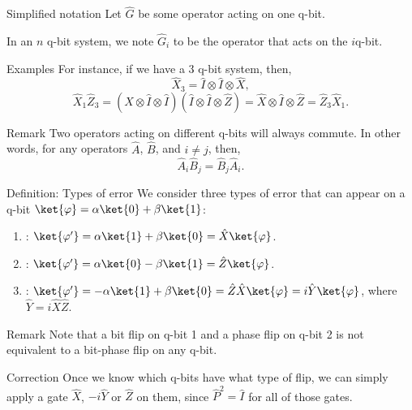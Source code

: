 \documentclass[a4paper]{article}
\begin{document}
\begin{parag}{Simplified notation}
    Let $\hat{G}$ be some operator acting on one q-bit. 

    In an $n$ q-bit system, we note $\hat{G}_i$ to be the operator that acts on the $i$\Th q-bit.

    \begin{subparag}{Examples}
        For instance, if we have a 3 q-bit system, then, 
        \[\hat{X}_3 = \hat{I} \otimes \hat{I} \otimes \hat{X},\]
        \[\hat{X}_1 \hat{Z}_3 = \left(\hat{X} \otimes \hat{I} \otimes \hat{I}\right) \left(\hat{I} \otimes \hat{I} \otimes \hat{Z}\right) = \hat{X} \otimes \hat{I} \otimes \hat{Z} = \hat{Z}_3 \hat{X}_1.\]
    \end{subparag}

    \begin{subparag}{Remark}
        Two operators acting on different q-bits will always commute. In other words, for any operators $\hat{A}$, $\hat{B}$, and $i \neq j$, then, 
        \[\hat{A}_i \hat{B}_j = \hat{B}_j \hat{A}_i.\]
    \end{subparag}
\end{parag}


\begin{parag}{Definition: Types of error}
    We consider three types of error that can appear on a q-bit $\ket{\phi} = \alpha \ket{0} + \beta \ket{1}$:
    \begin{enumerate}
        \item {}: $\ket{\phi'} = \alpha \ket{1} + \beta \ket{0} = \hat{X} \ket{\phi}$.
        \item {}: $\ket{\phi'} = \alpha \ket{0} - \beta \ket{1} = \hat{Z} \ket{\phi}$.
        \item {}: $\ket{\phi'} = -\alpha \ket{1} + \beta \ket{0} = \hat{Z} \hat{X} \ket{\phi} = i \hat{Y} \ket{\phi}$, where $\hat{Y} = i \hat{X}\hat{Z}$.
    \end{enumerate}

    \begin{subparag}{Remark}
        Note that a bit flip on q-bit 1 and a phase flip on q-bit 2 is not equivalent to a bit-phase flip on any q-bit. 
    \end{subparag}

    \begin{subparag}{Correction}
        Once we know which q-bits have what type of flip, we can simply apply a gate $\hat{X}$, $-i\hat{Y}$ or $\hat{Z}$ on them, since $\hat{P}^2 = \hat{I}$ for all of those gates.
    \end{subparag}
\end{parag}
\end{document}

